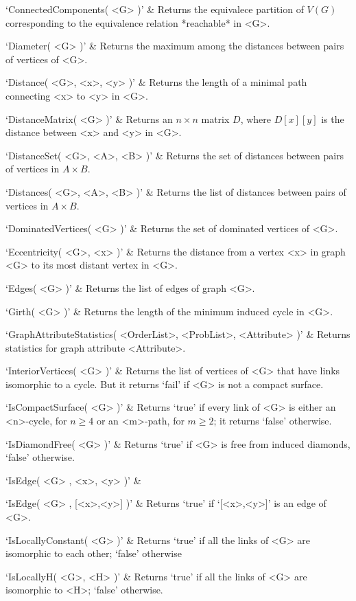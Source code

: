 `ConnectedComponents( <G> )' & 
Returns the equivalece partition of $V(G)$ corresponding to the equivalence relation *reachable* in <G>.

`Diameter( <G> )' & 
Returns the maximum among the distances between pairs of vertices of <G>.

`Distance( <G>, <x>, <y> )' & 
Returns the length of a minimal path connecting <x> to <y> in <G>.

`DistanceMatrix( <G> )' & 
Returns an $n\times n$ matrix $D$, where $D[x][y]$ is the distance between <x> and <y> in <G>.

`DistanceSet( <G>, <A>, <B> )' & 
Returns the set of distances between pairs of vertices in $A\times B$.

`Distances( <G>, <A>, <B> )' & 
Returns the list of distances between pairs of vertices in $A\times B$.

`DominatedVertices( <G> )' & 
Returns the set of dominated vertices of <G>.

`Eccentricity( <G>, <x> )' & 
Returns  the  distance  from a vertex <x> in graph <G> to its most distant vertex in <G>.

`Edges( <G> )' & 
Returns the list of edges of graph <G>.

`Girth( <G> )' &
Returns the length of the minimum induced cycle in <G>.

`GraphAttributeStatistics( <OrderList>, <ProbList>, <Attribute> )' &
Returns statistics for graph attribute <Attribute>. 

`InteriorVertices( <G> )' &
Returns the list of vertices of <G> that have links isomorphic to a cycle. 
But it returns `fail' if <G> is not a compact surface.

`IsCompactSurface( <G> )' &
Returns `true' if every link of <G> is either an <n>-cycle, for $n\geq 4$ or 
an <m>-path, for $m\geq 2$; it returns `false' otherwise.

`IsDiamondFree( <G> )' & 
Returns `true' if <G> is free from induced diamonds, `false' otherwise.

`IsEdge( <G> , <x>, <y> )' & 

`IsEdge( <G> , [<x>,<y>] )' & 
Returns `true' if `[<x>,<y>]' is an edge of <G>.

`IsLocallyConstant( <G> )' &
Returns `true' if all the links of <G> are isomorphic to each other; `false' otherwise

`IsLocallyH( <G>, <H> )' &
Returns `true' if all the links of <G> are isomorphic to <H>; `false' otherwise.

